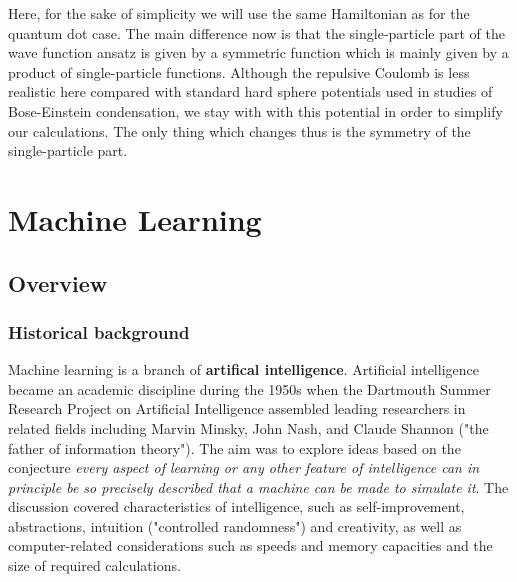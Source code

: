 \documentclass[twoside,english]{uiofysmaster}
\begin{document}
Here, for the sake of simplicity we will use the same Hamiltonian as
for the quantum dot case. The main difference now is that
the single-particle part of the wave function ansatz is given by a symmetric
function which is mainly given by a product of single-particle
functions. Although the repulsive Coulomb is less realistic here
compared with standard hard sphere potentials used in studies of
Bose-Einstein condensation, we stay with with this potential in order
to simplify our calculations. The only thing which changes thus is the
symmetry of the single-particle part. 











\chapter{Machine Learning}
\section{Overview}
\subsection{Historical background}
\label{sec:MLhistory}
Machine learning is a branch of \textbf{artifical intelligence}. Artificial intelligence became an academic discipline during the 1950s when the Dartmouth Summer Research Project on Artificial Intelligence assembled leading researchers in related fields including Marvin Minsky, John Nash, and Claude Shannon ("the father of information theory"). The aim was to explore ideas based on the conjecture \textit{every aspect of learning or any other feature of intelligence can in principle be so precisely described that a machine can be made to simulate it}. The discussion covered characteristics of intelligence, such as self-improvement, abstractions, intuition ("controlled randomness") and creativity, as well as computer-related considerations such as speeds and memory capacities and the size of required calculations.
\end{document}
